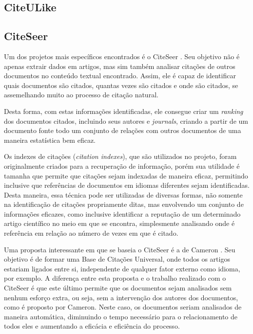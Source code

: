
\subsection{CiteULike}
\label{ssec:citeulike}


\subsection{CiteSeer}
\label{ssec:citeseer}

Um dos projetos mais específicos encontrados é o CiteSeer \cite{citeseer}. Seu objetivo não é apenas extrair dados em artigos, mas sim também analisar citações de outros documentos no conteúdo textual encontrado. Assim, ele é capaz de identificar quais documentos são citados, quantas vezes são citados e onde são citados, se assemelhando muito ao processo de citação natural.

Desta forma, com estas informações identificadas, ele consegue criar um \textit{ranking} dos documentos citados, incluindo seus autores e \textit{journals}, criando a partir de um documento fonte todo um conjunto de relações com outros documentos de uma maneira estatística bem eficaz.

Os indexes de citações (\textit{citation indexes}), que são utilizados no projeto, foram originalmente criados para a recuperação de informação, porém sua utilidade é tamanha que permite que citações sejam indexadas de maneira eficaz, permitindo inclusive que referências de documentos em idiomas diferentes sejam identificadas. Desta maneira, essa técnica pode ser utilizadas de diversas formas, não somente na identificação de citações propriamente ditas, mas envolvendo um conjunto de informações eficazes, como inclusive identificar a reputação de um determinado artigo científico no meio em que se encontra, simplesmente analisando onde é referência em relação ao número de vezes em que é citado.

Uma proposta interessante em que se baseia o CiteSeer é a de Cameron \cite{cameron}. Seu objetivo é de formar uma Base de Citações Universal, onde todos os artigos estariam ligados entre si, independente de qualquer fator externo como idioma, por exemplo. A diferença entre esta proposta e o trabalho realizado com o CiteSeer é que este último permite que os documentos sejam analisados sem nenhum esforço extra, ou seja, sem a intervenção dos autores dos documentos, como é proposto por Cameron. Neste caso, os documentos seriam analisados de maneira automática, diminuindo o tempo necessário para o relacionamento de todos eles e aumentando a eficácia e eficiência do processo.

